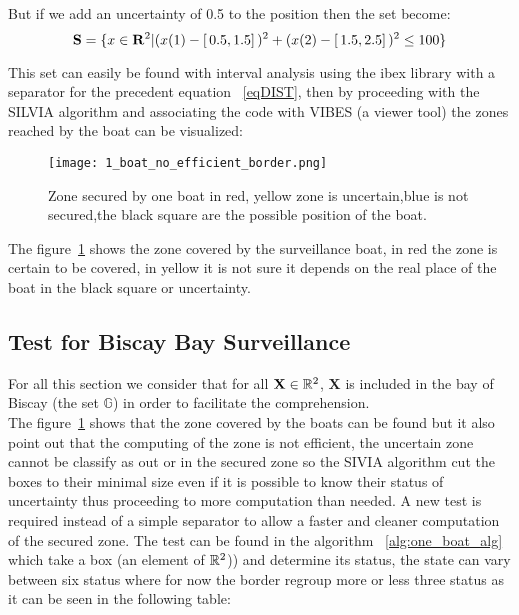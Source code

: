 But if we add an uncertainty of 0.5 to the position then the set become:
\begin{equation}
 \mathbf{S} = \{ x \in \mathbf{R}^{\textnormal{\ensuremath{2}}} | (x(1)-[ \,0.5,1.5] \,)^{\textnormal{\ensuremath{2}}} + (x(2)-[ \,1.5,2.5] \,)^{\textnormal{\ensuremath{2}}} \leq 100 \}  \label{eqDISTTHICK}
 \end{equation}

This set can easily be found with interval analysis using the ibex library with a separator for the precedent equation ~\eqref{eqDIST}, then by proceeding with the SILVIA algorithm and associating the code with VIBES (a viewer tool) the zones reached by the boat can be visualized:

\begin{figure}[H]
\centering
    \texttt{[image: 1\_boat\_no\_efficient\_border.png]}
    \caption{Zone secured by one boat in red, yellow zone is uncertain,blue is not secured,the black square are the possible position of the boat.}
    \label{fig:SecureZoneOneBoat}
\end{figure}

The figure~\ref{fig:SecureZoneOneBoat} shows the zone covered by the surveillance boat, in red the zone is certain to be covered, in yellow it is not sure it depends on the real place of the boat in the black square or uncertainty.

\subsection{Test for Biscay Bay Surveillance}
For all this section we consider that for all $\mathbf{X} \in \mathbb{R^{\textnormal{\ensuremath{2}}}}$,  $\mathbf{X}$ is included in the bay of Biscay (the set $\mathbb{G}$) in order to facilitate the comprehension.\\
The figure~\ref{fig:SecureZoneOneBoat} shows that the zone covered by the boats can be found but it also point out that the computing of the zone is not efficient, the uncertain zone cannot be classify as out or in the secured zone so the SIVIA algorithm cut the boxes to their minimal size even if it is possible to know their status of uncertainty thus proceeding to more computation than needed. A new test is required instead of a simple separator to allow a faster and cleaner computation of the secured zone.
The test can be found in the algorithm ~\ref{alg:one_boat_alg} which take a box (an element of $\mathbb{R}^{\textnormal{\ensuremath{2}}}$)) and determine its status, the state can vary between six status where for now the border regroup more or less three status as it can be seen in the following table:

